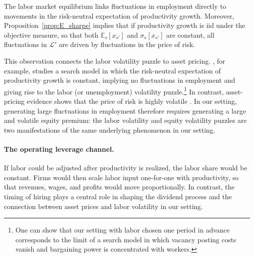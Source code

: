 The labor market equilibrium links fluctuations in employment directly to
movements in the risk-neutral expectation of productivity growth. 
Moreover,
Proposition~\ref{prop:E_sharpe} implies that if productivity growth is iid under the
objective measure, so that both $\mathbb E_s[x_{s'}]$ and $\sigma_s[x_{s'}]$ are constant,
all fluctuations in $\mathcal L'$ are driven by fluctuations in the price of risk.

This observation connects the labor volatility puzzle to asset pricing.
\citet{shimer2010labor}, for example, studies a search model in which the risk-neutral
expectation of productivity growth is constant, implying no fluctuations in employment
and giving rise to the labor (or unemployment) volatility puzzle.\footnote{One can show
that our setting with labor chosen one period in advance corresponds to the limit of a
search model in which vacancy posting costs vanish and bargaining power is concentrated
with workers.} In contrast, asset-pricing evidence shows that the price of risk is 
highly volatile 
\citep[e.g.,][]{hansen1991implications,cochrane2011presidential}. In our
setting, generating large fluctuations in employment therefore requires generating a
large and volatile equity premium: the labor volatility and equity volatility puzzles are
two manifestations of the same underlying phenomenon in our setting.


\paragraph{The operating leverage channel.}

If labor could be adjusted after productivity is realized, the labor share would be
constant. Firms would then scale labor input
one-for-one with productivity, so that revenues, wages, and profits would move
proportionally. In contrast, the timing of hiring plays a central role in shaping the
dividend process and the connection between asset prices and labor volatility in our
setting.

